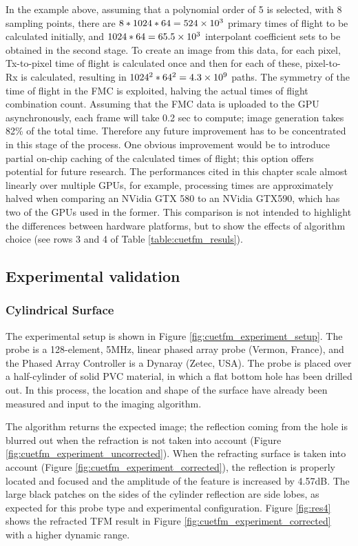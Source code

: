 In the example above, assuming that a polynomial order of 5 is selected, with 8 sampling points, there are $8*1024*64 = 524\times 10^{3}$ primary times of flight to be calculated initially, and $1024*64= 65.5\times 10^{3}$ interpolant coefficient sets to be obtained in the second stage. To create an image from this data, for each pixel, Tx-to-pixel time of flight is calculated once and then for each of these, pixel-to-Rx is calculated, resulting in $1024^2*64^2 = 4.3\times 10^{9}$ paths. The symmetry of the time of flight in the FMC is exploited, halving the actual times of flight combination count. Assuming that the FMC data is uploaded to the GPU asynchronously, each frame will take 0.2 sec to compute; image generation takes 82\% of the total time. Therefore any future improvement has to be concentrated in this stage of the process. One obvious improvement would be to introduce partial on-chip caching of the calculated times of flight; this option offers potential for future research. The performances cited in this chapter scale almost linearly over multiple GPUs, for example, processing times are approximately halved when comparing an NVidia GTX 580 to an NVidia GTX590, which has two of the GPUs used in the former. This comparison is not intended to highlight the differences between hardware platforms, but to show the effects of algorithm choice (see rows 3 and 4 of Table \ref{table:cuetfm_resuls}).

\subsection{Experimental validation}

\subsubsection{Cylindrical Surface}

The experimental setup is shown in Figure \ref{fig:cuetfm_experiment_setup}. The probe is a 128-element, 5MHz, linear phased array probe (Vermon, France), and the Phased Array Controller is a Dynaray (Zetec, USA). The probe is placed over a half-cylinder of solid PVC material, in which a flat bottom hole has been drilled out. In this process, the location and shape of the surface have already been measured and input to the imaging algorithm.

The algorithm returns the expected image; the reflection coming from the hole is blurred out when the refraction is not taken into account (Figure \ref{fig:cuetfm_experiment_uncorrected}). When the refracting surface is taken into account (Figure \ref{fig:cuetfm_experiment_corrected}), the reflection is properly located and focused and the amplitude of the feature is increased by 4.57dB. The large black patches on the sides of the cylinder reflection are side lobes, as expected for this probe type and experimental configuration. Figure \ref{fig:res4} shows the refracted TFM result in Figure \ref{fig:cuetfm_experiment_corrected} with a higher dynamic range.

